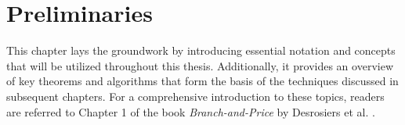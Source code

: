 \chapter{Preliminaries}\label{ch:preliminaries}
This chapter lays the groundwork by introducing essential notation and concepts that will be utilized throughout this thesis. Additionally, it provides an overview of key theorems and algorithms that form the basis of the techniques discussed in subsequent chapters. For a comprehensive introduction to these topics, readers are referred to Chapter 1 of the book \textit{Branch-and-Price} by Desrosiers et al. \cite{thebook}.



